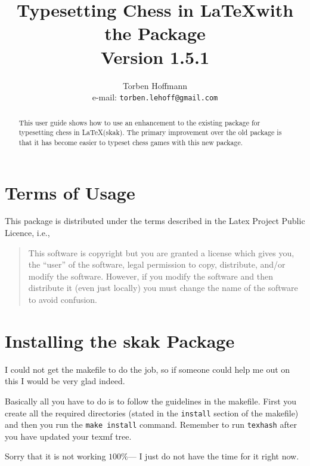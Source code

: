 \documentclass[10pt]{article}
\title{Typesetting Chess in \LaTeX with the \package{skak} Package\\
Version 1.5.1}
\author{Torben Hoffmann\\ e-mail: \texttt{torben.lehoff@gmail.com}}
\newcommand{\package}[1]{\textsf{#1}}
\begin{document}
\maketitle

\begin{abstract}
  This user guide shows how to use an enhancement to the existing
  package for typesetting chess in \LaTeX (\package{skak}). The
  primary improvement over the old package is that it has become
  easier to typeset chess games with this new package.
\end{abstract}

\newpage
\tableofcontents
\newpage



\section{Terms of Usage}
\label{sec:terms-usage}

This package is distributed under the terms described in the Latex
Project Public Licence, i.e.,

\begin{quote}
  This software is copyright but you are granted a license which gives
  you, the ``user'' of the software, legal permission to copy,
  distribute, and/or modify the software. However, if you modify the
  software and then distribute it (even just locally) you must change
  the name of the software to avoid confusion.
\end{quote}



\section{Installing the \package{skak} Package}
\label{sec:install}

I could not get the makefile to do the job, so if someone could help
me out on this I would be very glad indeed.

Basically all you have to do is to follow the guidelines in the
makefile. First you create all the required directories (stated in the
\texttt{install} section of the makefile) and then you run the
\texttt{make install} command. Remember to run \texttt{texhash} after
you have updated your texmf tree.

Sorry that it is not working $100\%$--- I just do not have the time for
it right now.
\end{document}
